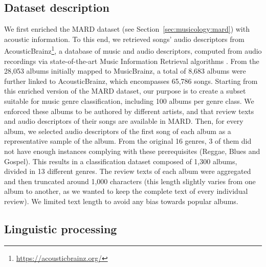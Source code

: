 \subsection{Dataset description}
\label{sec:similarity:mard}

We first enriched the MARD dataset (see Section~\ref{sec:musicology:mard}) with acoustic information. To this end, we retrieved songs' audio descriptors from AcousticBrainz\footnote{\url{https://acousticbrainz.org/}}, a database of music and audio descriptors, computed from audio recordings via state-of-the-art Music Information Retrieval algorithms \cite{Porter2015}. From the 28,053 albums initially mapped to MusicBrainz, a total of 8,683 albums were further linked to AcousticBrainz, which encompasses 65,786 songs.
Starting from this enriched version of the MARD dataset, our purpose is to create a subset suitable for music genre classification, including 100 albums per genre class. We enforced these albums to be authored by different artists, and that review texts and audio descriptors of their songs are available in MARD. Then, for every album, we selected audio descriptors of the first song of each album as a representative sample of the album. From the original 16 genres, 3 of them did not have enough instances complying with these prerequisites (Reggae, Blues and Gospel). This results in a classification dataset composed of 1,300 albums, divided in 13 different genres. The review texts of each album were aggregated and then truncated around 1,000 characters (this length slightly varies from one album to another, as we wanted to keep the complete text of every individual review). We limited text length to avoid any bias towards popular albums.


\subsection{Linguistic processing}
\label{sec:similarity:processing}

